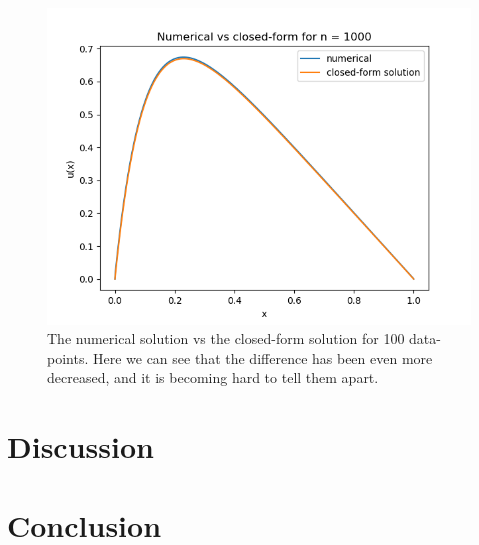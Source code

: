 \documentclass[a4paper,12pt,norsk]{article}
\begin{document}
	\begin{figure}[H]
		\includegraphics[scale = 0.7]{Figures/Figure_3.png}
		\centering
		\caption{The numerical solution vs the closed-form solution for 100 data-points. Here we can see that the difference has been even more decreased, and it is becoming hard to tell them apart.}
	\end{figure}
\section{Discussion}

\section{Conclusion}
\end{document}
